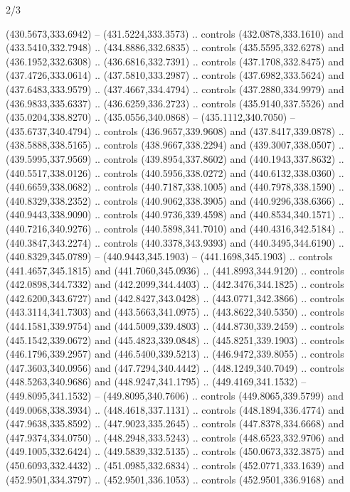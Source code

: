 \begin{flagdescription}{2/3}
\begin{scope}[xshift=0.5\flaglength,yshift=0.5\flagwidth,scale=\flagwidth/495.65]
\begin{scope}[y=0.8pt, x=0.8pt, yscale=-1,shift={(-463.76,-309.78)}]
  (430.5673,333.6942) -- (431.5224,333.3573) .. controls (432.0878,333.1610) and
  (433.5410,332.7948) .. (434.8886,332.6835) .. controls (435.5595,332.6278) and
  (436.1952,332.6308) .. (436.6816,332.7391) .. controls (437.1708,332.8475) and
  (437.4726,333.0614) .. (437.5810,333.2987) .. controls (437.6982,333.5624) and
  (437.6483,333.9579) .. (437.4667,334.4794) .. controls (437.2880,334.9979) and
  (436.9833,335.6337) .. (436.6259,336.2723) .. controls (435.9140,337.5526) and
  (435.0204,338.8270) .. (435.0556,340.0868) -- (435.1112,340.7050) --
  (435.6737,340.4794) .. controls (436.9657,339.9608) and (437.8417,339.0878) ..
  (438.5888,338.5165) .. controls (438.9667,338.2294) and (439.3007,338.0507) ..
  (439.5995,337.9569) .. controls (439.8954,337.8602) and (440.1943,337.8632) ..
  (440.5517,338.0126) .. controls (440.5956,338.0272) and (440.6132,338.0360) ..
  (440.6659,338.0682) .. controls (440.7187,338.1005) and (440.7978,338.1590) ..
  (440.8329,338.2352) .. controls (440.9062,338.3905) and (440.9296,338.6366) ..
  (440.9443,338.9090) .. controls (440.9736,339.4598) and (440.8534,340.1571) ..
  (440.7216,340.9276) .. controls (440.5898,341.7010) and (440.4316,342.5184) ..
  (440.3847,343.2274) .. controls (440.3378,343.9393) and (440.3495,344.6190) ..
  (440.8329,345.0789) -- (440.9443,345.1903) -- (441.1698,345.1903) .. controls
  (441.4657,345.1815) and (441.7060,345.0936) .. (441.8993,344.9120) .. controls
  (442.0898,344.7332) and (442.2099,344.4403) .. (442.3476,344.1825) .. controls
  (442.6200,343.6727) and (442.8427,343.0428) .. (443.0771,342.3866) .. controls
  (443.3114,341.7303) and (443.5663,341.0975) .. (443.8622,340.5350) .. controls
  (444.1581,339.9754) and (444.5009,339.4803) .. (444.8730,339.2459) .. controls
  (445.1542,339.0672) and (445.4823,339.0848) .. (445.8251,339.1903) .. controls
  (446.1796,339.2957) and (446.5400,339.5213) .. (446.9472,339.8055) .. controls
  (447.3603,340.0956) and (447.7294,340.4442) .. (448.1249,340.7049) .. controls
  (448.5263,340.9686) and (448.9247,341.1795) .. (449.4169,341.1532) --
  (449.8095,341.1532) -- (449.8095,340.7606) .. controls (449.8065,339.5799) and
  (449.0068,338.3934) .. (448.4618,337.1131) .. controls (448.1894,336.4774) and
  (447.9638,335.8592) .. (447.9023,335.2645) .. controls (447.8378,334.6668) and
  (447.9374,334.0750) .. (448.2948,333.5243) .. controls (448.6523,332.9706) and
  (449.1005,332.6424) .. (449.5839,332.5135) .. controls (450.0673,332.3875) and
  (450.6093,332.4432) .. (451.0985,332.6834) .. controls (452.0771,333.1639) and
  (452.9501,334.3797) .. (452.9501,336.1053) .. controls (452.9501,336.9168) and

\end{scope}
\end{scope}
\end{flagdescription}
